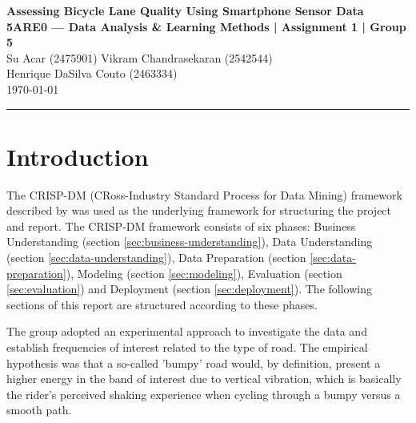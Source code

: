 \documentclass[10pt,a4paper]{article}
\begin{document}
\begin{center}
 {\large\bfseries Assessing Bicycle Lane Quality Using Smartphone Sensor Data}\\[3pt]
 {\bfseries 5ARE0 — Data Analysis \& Learning Methods | Assignment 1 | Group 5}\\[4pt]
 Su Acar (2475901) \quad Vikram Chandrasekaran (2542544)\\
 Henrique DaSilva Couto (2463334)\\[3pt]
 \today
\end{center}
\vspace{-5pt}\hrule\vspace{4pt}
\small
\section{Introduction}
The CRISP-DM (CRoss-Industry Standard Process for Data Mining) framework described by \cite{shearer00crisp} was used as the underlying framework for structuring the project and report. The CRISP-DM framework consists of six phases: Business Understanding (section \ref{sec:business-understanding}), Data Understanding (section \ref{sec:data-understanding}), Data Preparation (section \ref{sec:data-preparation}), Modeling (section \ref{sec:modeling}), Evaluation (section \ref{sec:evaluation}) and Deployment (section \ref{sec:deployment}). The following sections of this report are structured according to these phases.

The group adopted an experimental approach to investigate the data and establish frequencies of interest related to the type of road. The empirical hypothesis was that a so-called 'bumpy' road would, by definition, present a higher energy in the band of interest due to vertical vibration, which is basically the rider's perceived shaking experience when cycling through a bumpy versus a smooth path.

\end{document}

